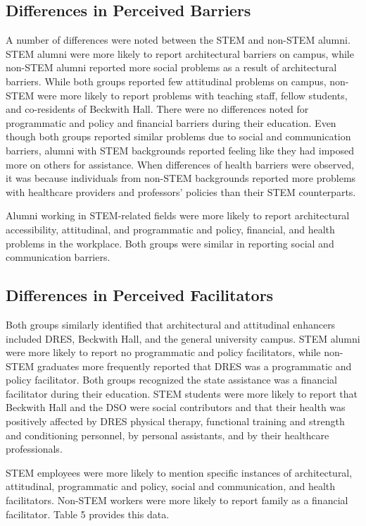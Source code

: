 \documentclass[11.5pt]{sig-alternate} %
\begin{document}
\begin{large}
\subsection*{Differences in Perceived Barriers}
A number of differences were noted between the STEM and non-STEM alumni. STEM alumni were more likely to report architectural barriers on campus, while non-STEM alumni reported more social problems as a result of architectural barriers. While both groups reported few attitudinal problems on campus, non-STEM were more likely to report problems with teaching staff, fellow students, and co-residents of Beckwith Hall. There were no differences noted for programmatic and policy and financial barriers during their education. Even though both groups reported similar problems due to social and communication barriers, alumni with STEM backgrounds reported feeling like they had imposed more on others for assistance. When differences of health barriers were observed, it was because individuals from non-STEM backgrounds reported more problems with healthcare providers and professors' policies than their STEM counterparts. 

Alumni working in STEM-related fields were more likely to report architectural accessibility, attitudinal, and programmatic and policy, financial, and health problems in the workplace. Both groups were similar in reporting social and communication barriers.

\subsection*{Differences in Perceived Facilitators}
Both groups similarly identified that architectural and attitudinal enhancers included DRES, Beckwith Hall, and the general university campus. STEM alumni were more likely to report no programmatic and policy facilitators, while non-STEM graduates more frequently reported that DRES was a programmatic and policy facilitator. Both groups recognized the state assistance was a financial facilitator during their education. STEM students were more likely to report that Beckwith Hall and the DSO were social contributors and that their health was positively affected by DRES physical therapy, functional training and strength and conditioning personnel, by personal assistants, and by their healthcare professionals. 

STEM employees were more likely to mention specific instances of architectural, attitudinal, programmatic and policy, social and communication, and health facilitators. Non-STEM workers were more likely to report family as a financial facilitator. Table 5 provides this data.


\end{large}
\end{document}
